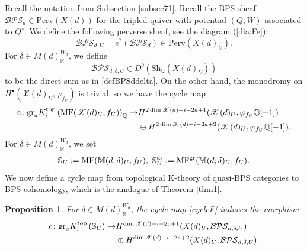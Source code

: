\documentclass [11pt,oneside,a4paper,mathscr]{amsart}
\newtheorem{prop}[thm]{Proposition}
\theoremstyle{definition}
\newcommand{\X}{\mathscr{X}}
\newcommand{\ssslash}{/\!\!/}
\begin{document}
Recall the notation from Subsection \ref{subsec71}.
Recall the BPS sheaf $\mathcal{BPS}_d\in \mathrm{Perv}(X(d))$ for the tripled quiver with potential $(Q,W)$ associated to $Q^\circ$.
We define the following perverse sheaf, 
see the diagram (\ref{dia:Fe}):
\[\mathcal{BPS}_{d, U}=e^*(\mathcal{BPS}_d)\in \mathrm{Perv}(X(d)_U).\] 
For $\delta\in M(d)^{W_d}_\mathbb{R}$, we define 
\[\mathcal{BPS}_{d, \delta, U}\in D^b(\mathrm{Sh}_{\mathbb{Q}}(X(d)_U))\]
to be the direct sum 
as in \eqref{defBPSddelta}.
On the other hand, the monodromy 
on $H^\bullet(\mathscr{X}(d)_U, \varphi_{f_U})$ is trivial, so 
we have the cycle map
\begin{align}\label{cycleF}
\mathrm{c}\colon \mathrm{gr}_a K^{\mathrm{top}}_i\left(\mathrm{MF}(\mathscr{X}(d)_U, f_U)\right)_{\mathbb{Q}} \to &
H^{2\dim\X(d)-i-2a+1}(\mathscr{X}(d)_U, \varphi_{f_U}\mathbb{Q}[-1]) \\
&\notag \oplus H^{2\dim\X(d)-i-2a+2}(\mathscr{X}(d)_U, \varphi_{f_U}\mathbb{Q}[-1]).
\end{align}
For $\delta \in M(d)_{\mathbb{R}}^{W_d}$, we set
\begin{align*}
    \mathbb{S}_U:=\mathrm{MF}(\mathbb{M}(d; \delta)_U, f_U), \ 
    \mathbb{S}_U^{\rm{gr}} :=\mathrm{MF}^{\rm{gr}}(\mathbb{M}(d; \delta)_U, f_U). 
\end{align*}
We now define a cycle map from topological K-theory of quasi-BPS categories to BPS cohomology, which is the analogue of Theorem \ref{thm1}.

\begin{prop}\label{prop617}
For $\delta\in M(d)^{W_d}_\mathbb{R}$, the 
cycle map \eqref{cycleF} induces the morphism 
\begin{align}\label{cyclemapetale0}
\mathrm{c}\colon \mathrm{gr}_a K^{\mathrm{top}}_i\left(\mathbb{S}_U\right)\to &H^{\dim \mathscr{X}(d)-i-2a+1}(X(d)_U, \mathcal{BPS}_{d, \delta, U}) \\
\notag&\oplus 
H^{\dim \mathscr{X}(d)-i-2a+2}(X(d)_U, \mathcal{BPS}_{d, \delta, U}).
\end{align}
\end{prop}
\end{document}
